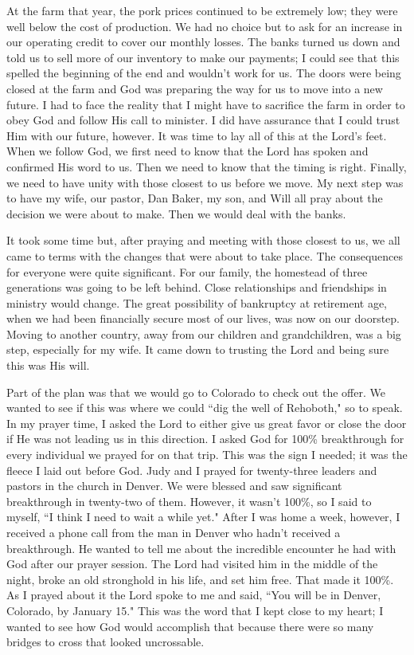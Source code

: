 \documentclass[oneside]{book}
\begin{document}
At the farm that year, the pork prices continued to be extremely low; they were well below the cost of production. We had no choice but to ask for an increase in our operating credit to cover our monthly losses. The banks turned us down and told us to sell more of our inventory to make our payments; I could see that this spelled the beginning of the end and wouldn't work for us. The doors were being closed at the farm and God was preparing the way for us to move into a new future. I had to face the reality that I might have to sacrifice the farm in order to obey God and follow His call to minister. I did have assurance that I could trust Him with our future, however. It was time to lay all of this at the Lord's feet. When we follow God, we first need to know that the Lord has spoken and confirmed His word to us. Then we need to know that the timing is right. Finally, we need to have unity with those closest to us before we move.  My next step was to have my wife, our pastor, Dan Baker, my son, and Will all pray about the decision we were about to make. Then we would deal with the banks.

It took some time but, after praying and meeting with those closest to us, we all came to terms with the changes that were about to take place. The consequences for everyone were quite significant. For our family, the homestead of three generations was going to be left behind. Close relationships and friendships in ministry would change. The great possibility of bankruptcy at retirement age, when we had been financially secure most of our lives, was now on our doorstep. Moving to another country, away from our children and grandchildren, was a big step, especially for my wife. It came down to trusting the Lord and being sure this was His will.

Part of the plan was that we would go to Colorado to check out the offer. We wanted to see if this was where we could ``dig the well of Rehoboth," so to speak. In my prayer time, I asked the Lord to either give us great favor or close the door if He was not leading us in this direction. I asked God for 100\% breakthrough for every individual we prayed for on that trip. This was the sign I needed; it was the fleece I laid out before God. Judy and I prayed for twenty-three leaders and pastors in the church in Denver. We were blessed and saw significant breakthrough in twenty-two of them. However, it wasn't 100\%, so I said to myself, ``I think I need to wait a while yet." After I was home a week, however, I received a phone call from the man in Denver who hadn't received a breakthrough. He wanted to tell me about the incredible encounter he had with God after our prayer session. The Lord had visited him in the middle of the night, broke an old stronghold in his life, and set him free. That made it 100\%. As I prayed about it the Lord spoke to me and said, ``You will be in Denver, Colorado, by January 15." This was the word that I kept close to my heart; I wanted to see how God would accomplish that because there were so many bridges to cross that looked uncrossable.
\end{document}
